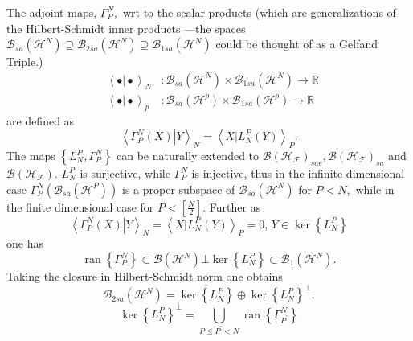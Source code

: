 \documentclass[aps,preprint]{revtex4}%
\begin{document}
The adjoint maps, $\Gamma_{P}^{N},$ wrt to the scalar products (which are
generalizations of the Hilbert-Schmidt inner products ---the spaces
$\mathcal{B}_{sa}\left(  \mathcal{H}^{N}\right)  \supseteq\mathcal{B}%
_{2sa}\left(  \mathcal{H}^{N}\right)  \supseteq\mathcal{B}_{1sa}\left(
\mathcal{H}^{N}\right)  $ could be thought of as a Gelfand Triple.)
\begin{align}
\text{ }\left\langle \left.  \bullet\right\vert \bullet\right\rangle _{N}  &
:\mathcal{B}_{sa}\left(  \mathcal{H}^{N}\right)  \times\mathcal{B}%
_{1sa}\left(  \mathcal{H}^{N}\right)  \rightarrow\mathbb{R}\\
\text{ }\left\langle \left.  \bullet\right\vert \bullet\right\rangle _{p}  &
:\mathcal{B}_{sa}\left(  \mathcal{H}^{p}\right)  \times\mathcal{B}%
_{1sa}\left(  \mathcal{H}^{p}\right)  \rightarrow\mathbb{R}%
\end{align}
are defined as
\begin{equation}
\left\langle \left.  \Gamma_{P}^{N}\left(  X\right)  \right\vert
Y\right\rangle _{N}=\left\langle \left.  X\right\vert L_{N}^{P}\left(
Y\right)  \right\rangle _{P}.
\end{equation}
The maps $\left\{  L_{N}^{P},\Gamma_{P}^{N}\right\}  $ can be naturally
extended to $\mathcal{B}\left(  \mathcal{H}_{\mathcal{F}}\right)
_{sae},\mathcal{B}\left(  \mathcal{H}_{\mathcal{F}}\right)  _{sa}$ and
$\mathcal{B}\left(  \mathcal{H}_{\mathcal{F}}\right)  .$ $L_{N}^{P}$ is
surjective, while $\Gamma_{P}^{N}$ is injective, thus in the infinite
dimensional case $\Gamma_{P}^{N}\left(  \mathcal{B}_{sa}\left(  \mathcal{H}%
^{P}\right)  \right)  $ is a proper subspace of $\mathcal{B}_{sa}\left(
\mathcal{H}^{N}\right)  $ for $P<N,$ while in the finite dimensional case for
$P<\left[  \frac{N}{2}\right]  .$ Further as
\begin{equation}
\left\langle \left.  \Gamma_{P}^{N}\left(  X\right)  \right\vert
Y\right\rangle _{N}=\left\langle \left.  X\right\vert L_{N}^{P}\left(
Y\right)  \right\rangle _{P}=0,\,Y\in\ker\left\{  L_{N}^{P}\right\}
\end{equation}
one has
\begin{equation}
\operatorname*{ran}\left\{  \Gamma_{P}^{N}\right\}  \subset\mathcal{B}\left(
\mathcal{H}^{N}\right)  \bot\ker\left\{  L_{N}^{P}\right\}  \subset
\mathcal{B}_{1}\left(  \mathcal{H}^{N}\right)  .
\end{equation}
Taking the closure in Hilbert-Schmidt norm one obtains
\begin{equation}
\mathcal{B}_{2sa}\left(  \mathcal{H}^{N}\right)  =\overline{\ker\left\{
L_{N}^{P}\right\}  }\oplus\ker\left\{  L_{N}^{P}\right\}  ^{\bot}.
\end{equation}%
\begin{equation}
\ker\left\{  L_{N}^{P}\right\}  ^{\bot}=%
{\displaystyle\bigcup\limits_{P\leq P^{\prime}<N}}
\operatorname*{ran}\left\{  \Gamma_{P^{\prime}}^{N}\right\}
\end{equation}
\end{document}
